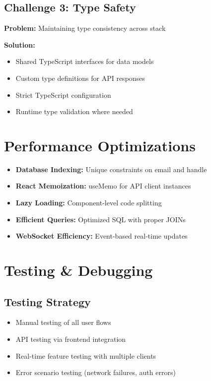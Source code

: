 \documentclass[11pt,a4paper]{article}
\begin{document}
\subsection{Challenge 3: Type Safety}

\textbf{Problem:} Maintaining type consistency across stack

\textbf{Solution:}
\begin{itemize}[leftmargin=*]
    \item Shared TypeScript interfaces for data models
    \item Custom type definitions for API responses
    \item Strict TypeScript configuration
    \item Runtime type validation where needed
\end{itemize}

\section{Performance Optimizations}

\begin{itemize}[leftmargin=*]
    \item \textbf{Database Indexing:} Unique constraints on email and handle
    \item \textbf{React Memoization:} useMemo for API client instances
    \item \textbf{Lazy Loading:} Component-level code splitting
    \item \textbf{Efficient Queries:} Optimized SQL with proper JOINs
    \item \textbf{WebSocket Efficiency:} Event-based real-time updates
\end{itemize}

\section{Testing \& Debugging}

\subsection{Testing Strategy}
\begin{itemize}[leftmargin=*]
    \item Manual testing of all user flows
    \item API testing via frontend integration
    \item Real-time feature testing with multiple clients
    \item Error scenario testing (network failures, auth errors)
\end{itemize}
\end{document}
